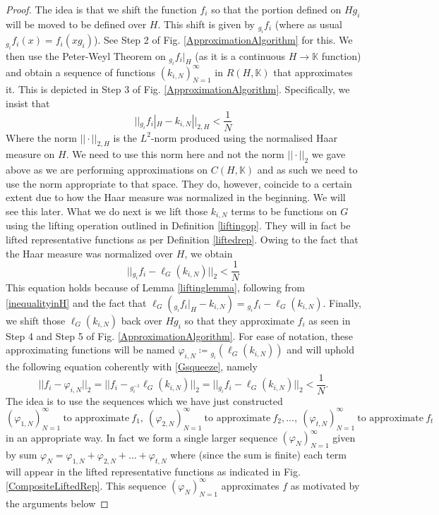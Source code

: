 \documentclass{amsart}
\theoremstyle{definition}
\numberwithin{equation}{section}
\newcommand{\K}{\mathbb{K}}
\begin{document}
\begin{proof}
 The idea is that we shift the function $f_i$ so that the portion defined on $Hg_i$ will be moved to be defined over $H$. This shift is given by ${}_{g_i}f_i$ (where as usual ${}_{g_i}f_i(x)=f_i(xg_i)$). See Step 2 of Fig. \ref{ApproximationAlgorithm} for this.  We then use the Peter-Weyl Theorem on ${}_{g_i}f_i|_{H}$ (as it is a continuous $H\rightarrow\K$ function) and obtain a sequence of functions $(k_{i,N})_{N=1}^{\infty}$ in $R(H,\K)$ that approximates it. This is depicted in Step 3 of Fig. \ref{ApproximationAlgorithm}. Specifically, we insist that
 \begin{equation}\label{inequalityinH}
 ||{}_{g_i}f_i|_{H}-k_{i,N}||_{2,H}<\frac{1}{N}
 \end{equation}
 Where the norm $||\cdot||_{2,H}$ is the $L^2$-norm produced using the normalised Haar measure on $H$. We need to use this norm here and not the norm $||\cdot||_2$ we gave above as we are performing approximations on $C(H,\K)$ and as such we need to use the norm appropriate to that space. They do, however, coincide to a certain extent due to how the Haar measure was normalized in the beginning.  We will see this later. What we do next is we lift those $k_{i,N}$ terms to be functions on $G$ using the lifting operation outlined in Definition \ref{liftingop}. They will in fact be lifted representative functions as per Definition \ref{liftedrep}. Owing to the fact that the Haar measure was normalized over $H$, we  obtain
 \begin{equation}\label{Gsqueeze}
 ||{}_{g_i}f_i-\ell_G({k_{i,N}})||_{2}<\frac{1}{N}
 \end{equation}
 This equation holds  because of Lemma \ref{liftinglemma}, following from \eqref{inequalityinH} and the fact that $\ell_G{({}_{g_i}f_i|_H-k_{i,N})}={}_{g_i}f_i-\ell_G({k_{i,N}})$.  Finally, we shift those $\ell_G({k_{i,N}})$ back over $Hg_i$ so that they approximate $f_i$ as seen in Step 4 and Step 5 of Fig. \ref{ApproximationAlgorithm}. For ease of notation, these approximating functions will be named $\varphi_{i,N}\coloneqq {}_{g_i}(\ell_G({k_{i,N}}))$ and will uphold the following equation coherently with  \eqref{Gsqueeze}, namely
 \[
 ||f_i-\varphi_{i,N}||_2=||f_i-{}_{g_i^{-1}}
 \ell_G({k_{i,N}})||_2=||{}_{g_i}f_i-
 \ell_G({k_{i,N}})||_2<\frac{1}{N}.
 \]
 The idea is  to use the sequences which we have just constructed
 \[(\varphi_{1,N})_{N=1}^{\infty}  \ \mbox{to approximate} \  f_1,  \ (\varphi_{2,N})_{N=1}^{\infty} \  \mbox{to approximate} \  f_2,  ...,  \ (\varphi_{t,N})_{N=1}^{\infty} \  \mbox{to approximate} \ f_t\]
in an appropriate way.  In fact we form a single larger sequence $(\varphi_N)_{N=1}^{\infty}$ given by sum $\varphi_N=\varphi_{1,N}+\varphi_{2,N}+...+\varphi_{t,N}$ where (since the sum is finite) each term  will  appear in the lifted representative functions as indicated in Fig. \ref{CompositeLiftedRep}. This sequence $(\varphi_{N})_{N=1}^{\infty}$ approximates $f$ as motivated by the arguments below

\end{proof}
\end{document}
